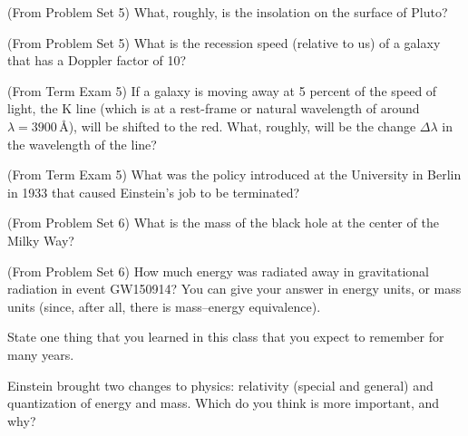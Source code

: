 \documentclass[12pt, letterpaper]{article}
\begin{document}
\begin{problem}
  (From Problem Set 5)
  What, roughly, is the insolation on the surface of Pluto?
\end{problem}

\begin{problem}
  (From Problem Set 5)
  What is the recession speed (relative to us) of a galaxy that has a Doppler
  factor of 10?
\end{problem}

\begin{problem}
  (From Term Exam 5)
  If a galaxy is moving away at 5 percent of the speed of light, the K
line (which is at a rest-frame or natural wavelength of around $\lambda =
3900$\,\AA), will be shifted to the red. What, roughly, will be the change
$\Delta\lambda$ in the wavelength of the line?
\end{problem}

\begin{problem}
  (From Term Exam 5)
  What was the policy introduced at the University in Berlin in 1933 that caused Einstein's job to be terminated?
\end{problem}

\begin{problem}
  (From Problem Set 6)
  What is the mass of the black hole at the center of the Milky Way?
\end{problem}

\begin{problem}
  (From Problem Set 6)
  How much energy was radiated away in gravitational radiation in event GW150914?
  You can give your answer in energy units, or mass units (since, after all, there
  is mass--energy equivalence).
\end{problem}

\begin{problem}
  State one thing that you learned in this class
  that you expect to remember for many years.
\end{problem}

\begin{problem}
  Einstein brought two changes to physics: relativity (special and general) and
  quantization of energy and mass. Which do you think is more important, and why?
\end{problem}
\end{document}
